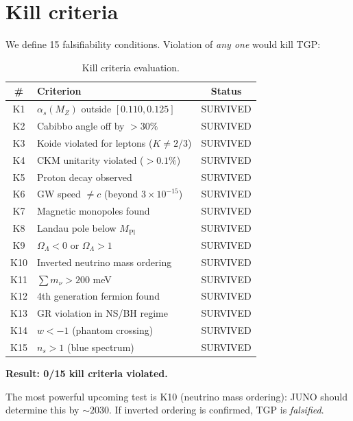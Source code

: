 \documentclass[aps,prd,twocolumn,superscriptaddress,showpacs,
  nofootinbib,floatfix,longbibliography]{revtex4-2}
\newcommand{\OL}{\Omega_\Lambda}
\newcommand{\as}{\alpha_s}
\newcommand{\MP}{M_\mathrm{Pl}}
\newcommand{\MZ}{M_Z}
\begin{document}
\section{Kill criteria}\label{sec:kill}

We define 15 falsifiability conditions. Violation of \emph{any one}
would kill TGP:

\begin{table}[b]
\caption{Kill criteria evaluation.}\label{tab:kill}
\begin{ruledtabular}
\begin{tabular}{clc}
\# & Criterion & Status \\
\hline
K1 & $\as(\MZ)$ outside $[0.110, 0.125]$ & SURVIVED \\
K2 & Cabibbo angle off by $> 30\%$ & SURVIVED \\
K3 & Koide violated for leptons ($K \neq 2/3$) & SURVIVED \\
K4 & CKM unitarity violated ($> 0.1\%$) & SURVIVED \\
K5 & Proton decay observed & SURVIVED \\
K6 & GW speed $\neq c$ (beyond $3\!\times\!10^{-15}$) & SURVIVED \\
K7 & Magnetic monopoles found & SURVIVED \\
K8 & Landau pole below $\MP$ & SURVIVED \\
K9 & $\OL < 0$ or $\OL > 1$ & SURVIVED \\
K10 & Inverted neutrino mass ordering & SURVIVED \\
K11 & $\sum m_\nu > 200$ meV & SURVIVED \\
K12 & 4th generation fermion found & SURVIVED \\
K13 & GR violation in NS/BH regime & SURVIVED \\
K14 & $w < -1$ (phantom crossing) & SURVIVED \\
K15 & $n_s > 1$ (blue spectrum) & SURVIVED \\
\end{tabular}
\end{ruledtabular}
\end{table}

\textbf{Result: 0/15 kill criteria violated.}

The most powerful upcoming test is K10 (neutrino mass ordering):
JUNO should determine this by $\sim 2030$. If inverted ordering
is confirmed, TGP is \emph{falsified}.
\end{document}
